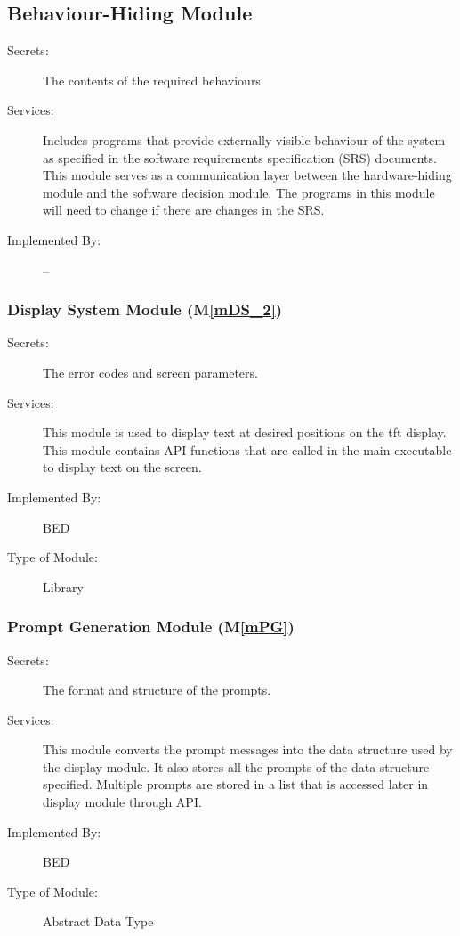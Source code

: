 \documentclass[12pt, titlepage]{article}
\newcommand{\mref}[1]{M\ref{#1}}
\begin{document}
\subsection{Behaviour-Hiding Module}

\begin{description}
  \item[Secrets:]The contents of the required behaviours.
  \item[Services:]Includes programs that provide externally visible behaviour of
  the system as specified in the software requirements specification (SRS)
  documents. This module serves as a communication layer between the
  hardware-hiding module and the software decision module. The programs in this
  module will need to change if there are changes in the SRS.
  \item[Implemented By:] --
\end{description}

\subsubsection{Display System Module (\mref{mDS_2}) }

\begin{description}
  \item[Secrets:]The error codes and screen parameters.
  \item[Services:] This module is used to display text at desired positions on the tft display.
    This module contains API functions that are called in the main executable to display text on the screen.
  \item[Implemented By:] BED
  \item[Type of Module:] Library
\end{description}

\subsubsection{Prompt Generation Module (\mref{mPG})}

\begin{description}
  \item[Secrets:]The format and structure of the prompts.
  \item[Services:] This module converts the prompt messages into the data structure used by the
    display module. It also stores all the prompts of the data structure specified. Multiple prompts are stored in a list that is accessed later in display module through API.
  \item[Implemented By:] BED
  \item[Type of Module:] Abstract Data Type
\end{description}
\end{document}
